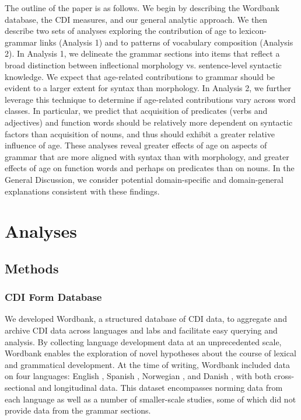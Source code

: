 \documentclass[10pt,letterpaper]{article}
\begin{document}
The outline of the paper is as follows. We begin by describing the Wordbank database, the CDI measures, and our general analytic approach. We then describe two sets of analyses exploring the contribution of age to lexicon-grammar links (Analysis 1) and to patterns of vocabulary composition (Analysis 2). In Analysis 1, we delineate the grammar sections into items that reflect a broad distinction between inflectional morphology vs. sentence-level syntactic knowledge. We expect that age-related contributions to grammar should be evident to a larger extent for syntax than morphology.  In Analysis 2, we further leverage this technique to determine if age-related contributions vary across word classes. In particular, we predict that acquisition of predicates (verbs and adjectives) and function words should be relatively more dependent on syntactic factors than acquisition of nouns, and thus should exhibit a greater relative influence of age. These analyses reveal greater effects of age on aspects of grammar that are more aligned with syntax than with morphology, and greater effects of age on function words and perhaps on predicates than on nouns. In the General Discussion, we consider potential domain-specific and domain-general explanations consistent with these findings.

\section{Analyses}

\subsection{Methods}

\subsubsection{CDI Form Database}

We developed Wordbank, a structured database of CDI data, to aggregate and archive CDI data across languages and labs and facilitate easy querying and analysis. By collecting language development data at an unprecedented scale, Wordbank enables the exploration of novel hypotheses about the course of lexical and grammatical development. At the time of writing, Wordbank included data on four languages: English \cite{fenson2007}, Spanish \cite{jackson1993}, Norwegian \cite{simonsen2014}, and Danish \cite{bleses2008}, with both cross-sectional and longitudinal data. This dataset encompasses norming data from each language as well as a number of smaller-scale studies, some of which did not provide data from the grammar sections. %
\end{document}
